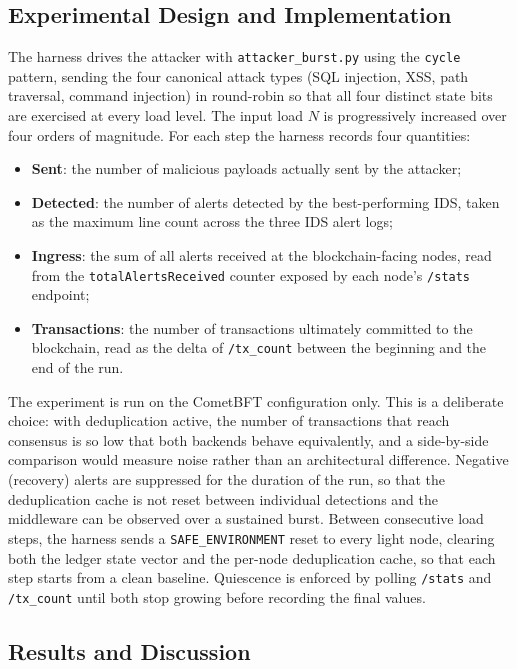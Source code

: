 \subsection{Experimental Design and Implementation}
\label{subsec:exp_dedup_design}

The harness drives the attacker with \texttt{attacker\_burst.py} using the \texttt{cycle} pattern, sending the four canonical attack types (SQL injection, XSS, path traversal, command injection) in round-robin so that all four distinct state bits are exercised at every load level. The input load $N$ is progressively increased over four orders of magnitude. For each step the harness records four quantities:
\begin{itemize}
    \item \textbf{Sent}: the number of malicious payloads actually sent by the attacker;
    \item \textbf{Detected}: the number of alerts detected by the best-performing IDS, taken as the maximum line count across the three IDS alert logs;
    \item \textbf{Ingress}: the sum of all alerts received at the blockchain-facing nodes, read from the \texttt{totalAlertsReceived} counter exposed by each node's \texttt{/stats} endpoint;
    \item \textbf{Transactions}: the number of transactions ultimately committed to the blockchain, read as the delta of \texttt{/tx\_count} between the beginning and the end of the run.
\end{itemize}

The experiment is run on the CometBFT configuration only. This is a deliberate choice: with deduplication active, the number of transactions that reach consensus is so low that both backends behave equivalently, and a side-by-side comparison would measure noise rather than an architectural difference. Negative (recovery) alerts are suppressed for the duration of the run, so that the deduplication cache is not reset between individual detections and the middleware can be observed over a sustained burst. Between consecutive load steps, the harness sends a \texttt{SAFE\_ENVIRONMENT} reset to every light node, clearing both the ledger state vector and the per-node deduplication cache, so that each step starts from a clean baseline. Quiescence is enforced by polling \texttt{/stats} and \texttt{/tx\_count} until both stop growing before recording the final values.

\subsection{Results and Discussion}
\label{subsec:exp_dedup_results}

